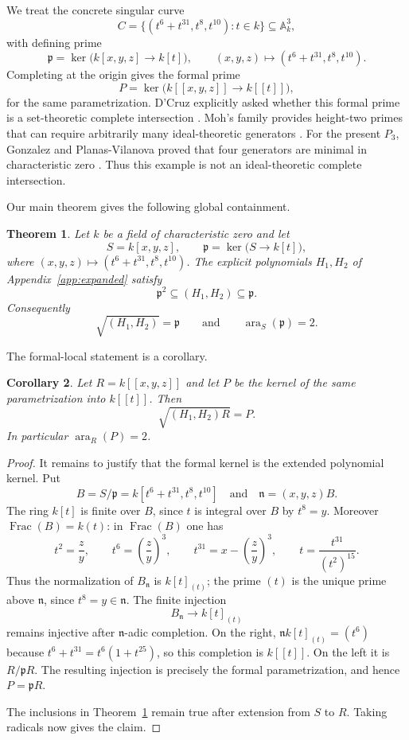 \documentclass[11pt]{amsart}
\newtheorem{theorem}{Theorem}[section]
\newtheorem{corollary}[theorem]{Corollary}
\theoremstyle{remark}
\DeclareMathOperator{\ara}{ara}
\begin{document}
We treat the concrete singular curve
\[
 C=\{(t^6+t^{31},t^8,t^{10}):t\in k\}\subseteq\mathbb A^3_k,
\]
with defining prime
\[
 \mathfrak p=\ker\bigl(k[x,y,z]\longrightarrow k[t]\bigr),\qquad
 (x,y,z)\longmapsto(t^6+t^{31},t^8,t^{10}).
\]
Completing at the origin gives the formal prime
\[
 P=\ker\bigl(k[[x,y,z]]\longrightarrow k[[t]]\bigr),
\]
for the same parametrization.  D'Cruz explicitly asked whether this formal prime is a set-theoretic complete intersection \cite[Question 2.5]{DCruz2020}.  Moh's family provides height-two primes that can require arbitrarily many ideal-theoretic generators \cite{Moh1974}.  For the present $P_3$, Gonzalez and Planas-Vilanova proved that four generators are minimal in characteristic zero \cite{GonzalezPlanas2026}.  Thus this example is not an ideal-theoretic complete intersection.

Our main theorem gives the following global containment.

\begin{theorem}\label{thm:main}
Let $k$ be a field of characteristic zero and let
\[
 S=k[x,y,z],\qquad
 \mathfrak p=\ker\bigl(S\longrightarrow k[t]\bigr),
\]
where $(x,y,z)\mapsto(t^6+t^{31},t^8,t^{10})$.  The explicit polynomials $H_1,H_2$ of Appendix~\ref{app:expanded} satisfy
\[
 \mathfrak p^2\subseteq(H_1,H_2)\subseteq\mathfrak p.
\]
Consequently
\[
 \sqrt{(H_1,H_2)}=\mathfrak p
 \qquad\text{and}\qquad
 \ara_S(\mathfrak p)=2.
\]
\end{theorem}

The formal-local statement is a corollary.

\begin{corollary}\label{cor:formal}
Let $R=k[[x,y,z]]$ and let $P$ be the kernel of the same parametrization into $k[[t]]$.  Then
\[
 \sqrt{(H_1,H_2)R}=P.
\]
In particular $\ara_R(P)=2$.
\end{corollary}

\begin{proof}
It remains to justify that the formal kernel is the extended polynomial
kernel.  Put
\[
 B=S/\mathfrak p
   =k[t^6+t^{31},t^8,t^{10}]
 \quad\text{and}\quad
 \mathfrak n=(x,y,z)B.
\]
The ring $k[t]$ is finite over $B$, since $t$ is integral over $B$ by
$t^8=y$.  Moreover $\operatorname{Frac}(B)=k(t)$: in
$\operatorname{Frac}(B)$ one has
\[
 t^2=\frac zy,\qquad
 t^6=\left(\frac zy\right)^3,\qquad
 t^{31}=x-\left(\frac zy\right)^3,
 \qquad
 t=\frac{t^{31}}{(t^2)^{15}}.
\]
Thus the normalization of $B_{\mathfrak n}$ is $k[t]_{(t)}$; the prime
$(t)$ is the unique prime above $\mathfrak n$, since $t^8=y\in\mathfrak n$.
The finite injection
\[
 B_{\mathfrak n}\longrightarrow k[t]_{(t)}
\]
remains injective after $\mathfrak n$-adic completion.  On the right,
$\mathfrak n k[t]_{(t)}=(t^6)$ because $t^6+t^{31}=t^6(1+t^{25})$,
so this completion is $k[[t]]$.  On the left it is
$R/\mathfrak pR$.  The resulting injection is precisely the formal
parametrization, and hence $P=\mathfrak pR$.

The inclusions in Theorem~\ref{thm:main} remain true after extension from
$S$ to $R$.  Taking radicals now gives the claim.
\end{proof}
\end{document}
